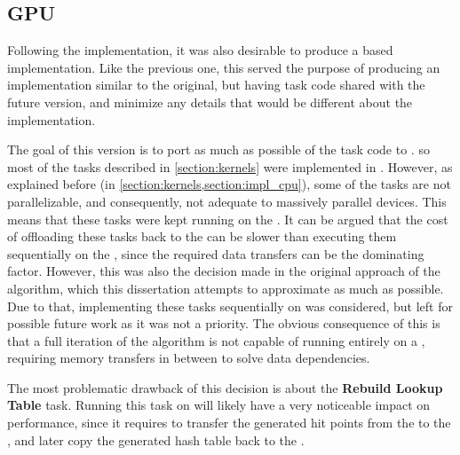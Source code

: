 \documentclass[main.tex]{subfiles}
\begin{document}
\subsection{GPU} \label{section:impl_cuda}

Following the \cpu implementation, it was also desirable to produce a \cuda based implementation. Like the previous one, this served the purpose of producing an implementation similar to the original, but having task code shared with the future \starpu version, and minimize any details that would be different about the implementation.

The goal of this version is to port as much as possible of the \cpu task code to \cuda. so most of the tasks described in \cref{section:kernels} were implemented in \cuda. However, as explained before (in \cref{section:kernels,section:impl_cpu}), some of the tasks are not parallelizable, and consequently, not adequate to massively parallel devices. This means that these tasks were kept running on the \cpu. It can be argued that the cost of offloading these tasks back to the \cpu can be slower than executing them sequentially on the \gpu, since the required data transfers can be the dominating factor. However, this was also the decision made in the original approach of the algorithm, which this dissertation attempts to approximate as much as possible. Due to that, implementing these tasks sequentially on \gpu was considered, but left for possible future work as it was not a priority. The obvious consequence of this is that a full iteration of the algorithm is not capable of running entirely on a \gpu, requiring memory transfers in between to solve data dependencies.

The most problematic drawback of this decision is about the \textbf{Rebuild Lookup Table} task. Running this task on \cpu will likely have a very noticeable impact on performance, since it requires to transfer the generated hit points from the \gpu to the \cpu, and later copy the generated hash table back to the \gpu.
\end{document}
